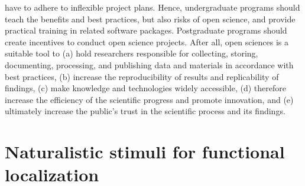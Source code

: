have to adhere to inflexible project plans.
%
Hence, undergraduate programs should teach the benefits and best practices, but
also risks of open science, and provide practical training in related software
packages.
%
Postgraduate programs should create incentives to conduct open science projects.
%
After all, open sciences is a suitable tool to
%
(a) hold researchers responsible for collecting, storing, documenting,
processing, and publishing data and materials in accordance with best practices,
%
(b) increase the reproducibility of results and replicability of findings,
%
(c) make knowledge and technologies widely accessible,
%
(d) therefore increase the efficiency of the scientific progress and promote
innovation, and
%
(e) ultimately increase the public's trust in the scientific process and its
findings.


\section{Naturalistic stimuli for functional localization}

